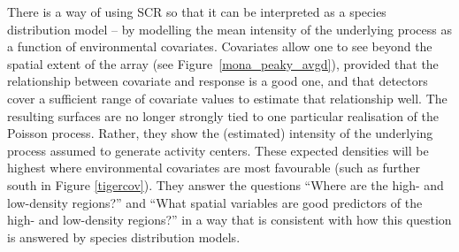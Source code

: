 \documentclass[10pt,a4paper]{article}
\begin{document}

There is a way of using SCR so that it can be interpreted as a species distribution model -- by modelling the mean intensity of the underlying process as a function of environmental covariates. Covariates allow one to see beyond the spatial extent of the array (see Figure~\ref{mona_peaky_avgd}), provided that the relationship between covariate and response is a good one, and that detectors cover a sufficient range of covariate values to estimate that relationship well. The resulting surfaces are no longer strongly tied to one particular realisation of the Poisson process. Rather, they show the (estimated) intensity of the underlying process assumed to generate activity centers. These expected densities will be highest where environmental covariates are most favourable (such as further south in Figure \ref{tigercov}). They  answer the questions ``Where are the high- and low-density regions?'' and ``What spatial variables are good predictors of the high- and low-density regions?'' in a way that is consistent with how this question is answered by species distribution models. %
\end{document}
